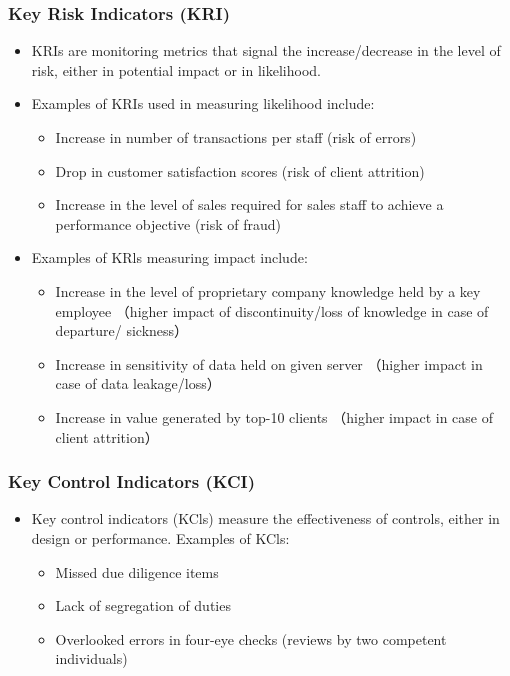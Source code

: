 \subsubsection{Key Risk Indicators (KRI) }
\begin{itemize}
\item KRIs are monitoring metrics that signal the increase/decrease in the level of risk, either in potential impact or in likelihood.
\item  Examples of KRIs used in measuring likelihood include:
    \begin{itemize}
    \item  Increase in number of transactions per staff (risk of errors)
    \item  Drop in customer satisfaction scores (risk of client attrition)
    \item  Increase in the level of sales required for sales staff to achieve a performance objective (risk of fraud)
    
    \end{itemize}
\item Examples of KRls measuring impact include:
    \begin{itemize}
    \item Increase in the level of proprietary company knowledge held by a key employee （higher impact of discontinuity/loss of knowledge in case of departure/ sickness）
    \item  Increase in sensitivity of data held on given server （higher impact in case of data leakage/loss）
    \item  Increase in value generated by top-10 clients （higher impact in case of client attrition）
    \end{itemize}

\end{itemize}

\subsubsection{Key Control Indicators (KCI) }
\begin{itemize}
\item Key control indicators (KCls) measure the effectiveness of controls, either in design or performance. Examples of KCls:
    \begin{itemize}
    \item Missed due diligence items
    \item  Lack of segregation of duties
    \item  Overlooked errors in four-eye checks (reviews by two competent individuals)
    \end{itemize}
\end{itemize}

